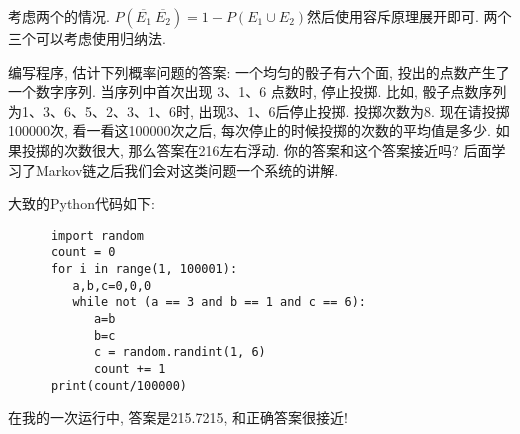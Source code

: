 \begin{solution*}
   考虑两个的情况. $P(\overline{E_1}~ \overline{E_2})=1-P({E_1}\cup {E_2})$然后使用容斥原理展开即可. 两个三个可以考虑使用归纳法. 
\end{solution*}

\begin{exercise}
   编写程序, 估计下列概率问题的答案: 一个均匀的骰子有六个面, 投出的点数产生了一个数字序列. 当序列中首次出现 3、1、6 点数时, 停止投掷. 比如, 骰子点数序列为1、3、6、5、2、3、1、6时, 出现3、1、6后停止投掷. 投掷次数为8. 现在请投掷100000次, 看一看这100000次之后, 每次停止的时候投掷的次数的平均值是多少. 如果投掷的次数很大, 那么答案在216左右浮动. 你的答案和这个答案接近吗? 后面学习了Markov链之后我们会对这类问题一个系统的讲解. 
\end{exercise}

\begin{solution*}
   大致的Python代码如下:
   \begin{verbatim}
      import random
      count = 0
      for i in range(1, 100001):
         a,b,c=0,0,0
         while not (a == 3 and b == 1 and c == 6):
            a=b
            b=c 
            c = random.randint(1, 6)
            count += 1
      print(count/100000)
   \end{verbatim}
   在我的一次运行中, 答案是215.7215, 和正确答案很接近! 
\end{solution*}